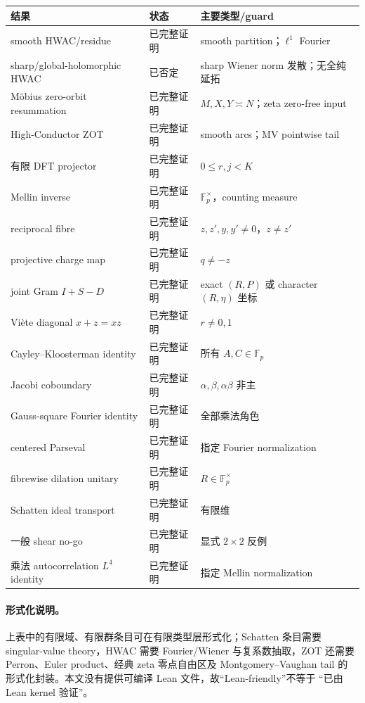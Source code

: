 \documentclass[11pt,a4paper]{ctexart}
\theoremstyle{definition}
\newcommand{\F}{\mathbb F}
\newcommand{\G}{\F_p^\times}
\newcommand{\1}{\mathbf 1}
\begin{document}
\begin{center}
\begin{tabular}{p{}p{}p{}}
\toprule
结果 & 状态 & 主要类型/guard\\
\midrule
smooth HWAC/residue & 已完整证明 & smooth partition；$\ell^1$ Fourier\\
sharp/global-holomorphic HWAC & 已否定 & sharp Wiener norm 发散；无全纯延拓\\
Möbius zero-orbit resummation & 已完整证明 & $M,X,Y\asymp N$；zeta zero-free input\\
High-Conductor ZOT & 已完整证明 & smooth arcs；MV pointwise tail\\
有限 DFT projector & 已完整证明 & $0\le r,j<K$\\
Mellin inverse & 已完整证明 & $\G$，counting measure\\
reciprocal fibre & 已完整证明 & $z,z',y,y'\ne0$，$z\ne z'$\\
projective charge map & 已完整证明 & $q\ne-z$\\
joint Gram $I+S-D$ & 已完整证明 & exact $(R,P)$ 或 character $(R,\eta)$ 坐标\\
Vi\`ete diagonal $x+z=xz$ & 已完整证明 & $r\ne0,1$\\
Cayley--Kloosterman identity & 已完整证明 & 所有 $A,C\in\F_p$\\
Jacobi coboundary & 已完整证明 & $\alpha,\beta,\alpha\beta$ 非主\\
Gauss-square Fourier identity & 已完整证明 & 全部乘法角色\\
centered Parseval & 已完整证明 & 指定 Fourier normalization\\
fibrewise dilation unitary & 已完整证明 & $R\in\G$\\
Schatten ideal transport & 已完整证明 & 有限维\\
一般 shear no-go & 已完整证明 & 显式 $2\times2$ 反例\\
乘法 autocorrelation $L^4$ identity & 已完整证明 & 指定 Mellin normalization\\
\bottomrule
\end{tabular}
\end{center}

\paragraph{形式化说明。}
上表中的有限域、有限群条目可在有限类型层形式化；Schatten 条目需要
singular-value theory，HWAC 需要 Fourier/Wiener 与复系数抽取，ZOT 还需要
Perron、Euler product、经典 zeta 零点自由区及 Montgomery--Vaughan tail 的
形式化封装。本文没有提供可编译 Lean 文件，故“Lean-friendly”不等于
“已由 Lean kernel 验证”。
\end{document}
